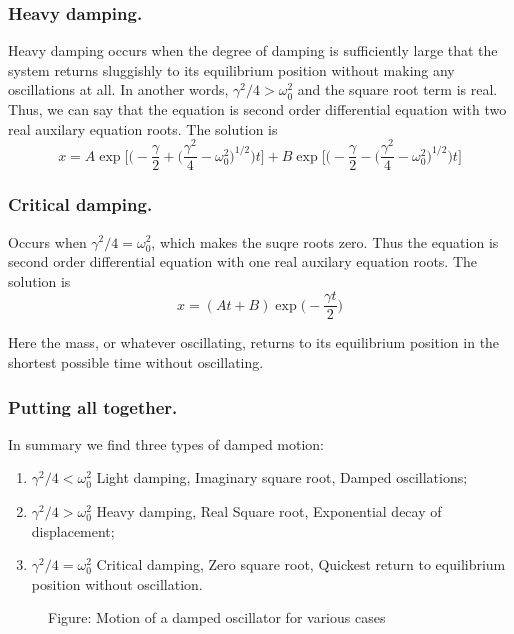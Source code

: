 \documentclass[../../../main.tex]{subfiles}
\begin{document}
\subsubsection{Heavy damping.} Heavy damping occurs when the degree of damping is sufficiently large that the system returns sluggishly to its equilibrium position without making any oscillations at all. In another words, $\gamma^2/4 > \omega_0^2$ and the square root term is real. Thus, we can say that the equation is second order differential equation with two real auxilary equation roots. The solution is
\begin{equation*}
    x=A\exp \biggl[\bigg(-\frac{\gamma}{2} + \big(\frac{\gamma^2}{4}-\omega_0^2\big)^{1/2}\bigg)t\biggr] +B \exp \biggl[\bigg(-\frac{\gamma}{2} - \big(\frac{\gamma^2}{4}-\omega_0^2\big)^{1/2}\bigg)t\biggr]
\end{equation*}

\subsubsection{Critical damping.} Occurs when $\gamma^2/4 = \omega_0^2$, which makes the suqre roots zero. Thus the equation is second order differential equation with one real auxilary equation roots. The solution is
\begin{equation*}
    x=(At+B)\exp\biggl(-\frac{\gamma t}{2}\biggr)
\end{equation*}

Here the mass, or whatever oscillating, returns to its equilibrium position in the shortest possible time without oscillating. 

\subsubsection{Putting all together.} In summary we find three types of damped motion:
\begin{enumerate}
    \item $\gamma^2/4<\omega_0^2$ Light damping, Imaginary square root, Damped oscillations;
    \item $\gamma^2/4>\omega_0^2$ Heavy damping, Real Square root, Exponential decay of displacement;
    \item $\gamma^2/4=\omega_0^2$ Critical damping, Zero square root, Quickest return to equilibrium position without oscillation.
\end{enumerate} 
\begin{figure}[h]
    \centering
    \caption*{Figure: Motion of a damped oscillator for various cases}
\end{figure}
\end{document}
